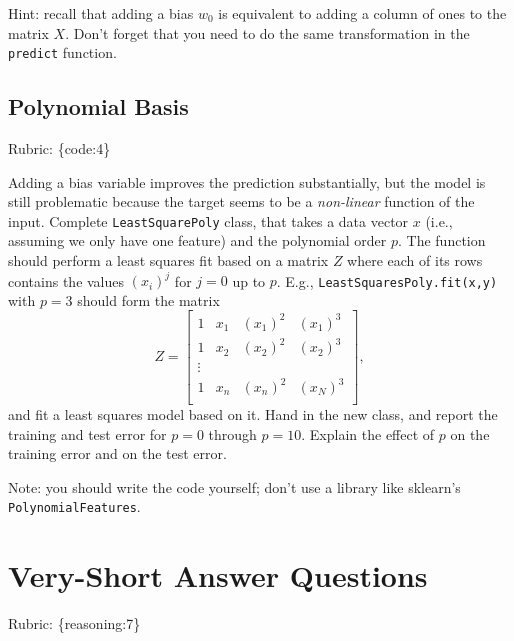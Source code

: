 \documentclass{article}
\def\rubric#1{\gre{Rubric: \{#1\}}}{}
\def\blu#1{{\color{blu}#1}}
\def\gre#1{{\color{gre}#1}}
\begin{document}
Hint: recall that adding a bias $w_0$ is equivalent to adding a column of ones to the matrix $X$. Don't forget that you need to do the same transformation in the \texttt{predict} function.


\subsection{Polynomial Basis}
\rubric{code:4}

Adding a bias variable improves the prediction substantially, but the model is still problematic because the target seems to be a \emph{non-linear} function of the input.
Complete \texttt{LeastSquarePoly} class, that takes a data vector $x$ (i.e., assuming we only have one feature) and the polynomial order $p$. The function should perform a least squares fit based on a matrix $Z$ where each of its rows contains the values $(x_{i})^j$ for $j=0$ up to $p$. E.g., \texttt{LeastSquaresPoly.fit(x,y)}  with $p = 3$ should form the matrix
\[
Z =
\left[\begin{array}{cccc}
1 & x_1 & (x_1)^2 & (x_1)^3\\
1 & x_2 & (x_2)^2 & (x_2)^3\\
\vdots\\
1 & x_n & (x_n)^2 & (x_N)^3\\
\end{array}
\right],
\]
and fit a least squares model based on it.
\blu{Hand in the new class, and report the training and test error for $p = 0$ through $p= 10$. Explain the effect of $p$ on the training error and on the test error.}

Note: you should write the code yourself; don't use a library like sklearn's \texttt{PolynomialFeatures}.


\section{Very-Short Answer Questions}
\rubric{reasoning:7}
\end{document}
